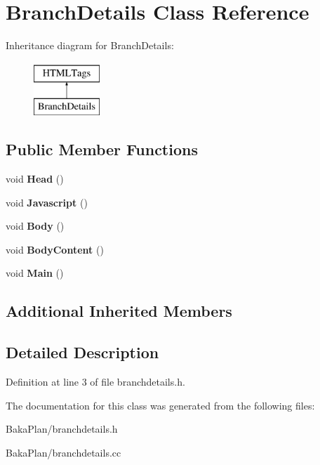 \hypertarget{classBranchDetails}{\section{Branch\-Details Class Reference}
\label{classBranchDetails}
}
Inheritance diagram for Branch\-Details\-:\begin{figure}[H]
\begin{center}
\leavevmode
\includegraphics[height=2.000000cm]{classBranchDetails}
\end{center}
\end{figure}
\subsection*{Public Member Functions}
\begin{DoxyCompactItemize}
\item 
\hypertarget{classBranchDetails_a73ad3b9f45e8608a54c68f951149f7b4}{void {\bfseries Head} ()}\label{classBranchDetails_a73ad3b9f45e8608a54c68f951149f7b4}

\item 
\hypertarget{classBranchDetails_a526355c7a1abcd150805d859a6d0d576}{void {\bfseries Javascript} ()}\label{classBranchDetails_a526355c7a1abcd150805d859a6d0d576}

\item 
\hypertarget{classBranchDetails_a4a564cea32737e719441566d284ff849}{void {\bfseries Body} ()}\label{classBranchDetails_a4a564cea32737e719441566d284ff849}

\item 
\hypertarget{classBranchDetails_abfba4740c8618388b79eb6550aad980a}{void {\bfseries Body\-Content} ()}\label{classBranchDetails_abfba4740c8618388b79eb6550aad980a}

\item 
\hypertarget{classBranchDetails_aa44ca0b62d7a37d6723f6135c1672058}{void {\bfseries Main} ()}\label{classBranchDetails_aa44ca0b62d7a37d6723f6135c1672058}

\end{DoxyCompactItemize}
\subsection*{Additional Inherited Members}


\subsection{Detailed Description}


Definition at line 3 of file branchdetails.\-h.



The documentation for this class was generated from the following files\-:\begin{DoxyCompactItemize}
\item 
Baka\-Plan/branchdetails.\-h\item 
Baka\-Plan/branchdetails.\-cc\end{DoxyCompactItemize}
